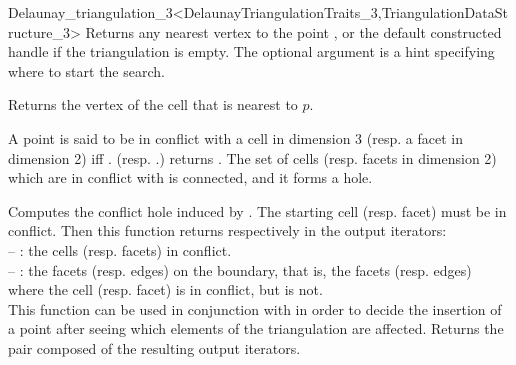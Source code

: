 \begin{ccRefClass}{Delaunay_triangulation_3<DelaunayTriangulationTraits_3,TriangulationDataStructure_3>}
{Returns any nearest vertex to the point , or the default constructed
handle if the triangulation is empty.  The optional argument  is a hint
specifying where to start the search.
}

{Returns the  vertex  of the cell  that is
nearest to $p$.
}

A point  is said to be in conflict with a cell  in dimension 3
(resp. a facet  in dimension 2) iff \ccVar.
(resp. \ccVar.) returns .
The set of cells (resp. facets in dimension 2) which are in conflict with
 is connected, and it forms a hole.

{Computes the  conflict hole induced by .  The starting cell
(resp.  facet)  must be in conflict.  Then this function returns
respectively in the output iterators:\\
-- : the cells (resp. facets) in conflict.\\
-- : the facets (resp. edges) on the boundary, that is, the facets
(resp. edges)  where the cell (resp. facet)  is in
conflict, but  is not.\\
This function can be used in conjunction with  in order
to decide the insertion of a point after seeing which elements of the
triangulation are affected.
Returns the pair composed of the resulting output iterators.
}


\end{ccRefClass}
